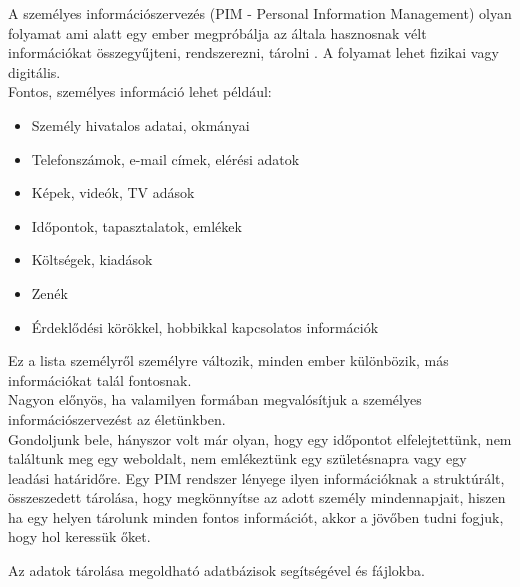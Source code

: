 
A személyes információszervezés (PIM - Personal Information Management) olyan folyamat ami alatt egy ember megpróbálja az általa hasznosnak vélt információkat összegyűjteni, rendszerezni, tárolni \cite{enwiki:1076787930}. A folyamat lehet fizikai vagy digitális.
\vspace{5pt}\\ Fontos, személyes információ lehet például:
\begin{itemize}
	\item Személy hivatalos adatai, okmányai
	\item Telefonszámok, e-mail címek, elérési adatok
	\item Képek, videók, TV adások
	\item Időpontok, tapasztalatok, emlékek
	\item Költségek, kiadások
	\item Zenék 
	\item Érdeklődési körökkel, hobbikkal kapcsolatos információk
\end{itemize}
Ez a lista személyről személyre változik, minden ember különbözik, más információkat talál fontosnak.
\vspace{5pt}\\ Nagyon előnyös, ha valamilyen formában megvalósítjuk a személyes információszervezést az életünkben. 
\\Gondoljunk bele, hányszor volt már olyan, hogy egy időpontot elfelejtettünk, nem találtunk meg egy weboldalt, nem emlékeztünk egy születésnapra vagy egy leadási határidőre. Egy PIM rendszer lényege ilyen információknak a struktúrált, összeszedett tárolása, hogy megkönnyítse az adott személy mindennapjait, hiszen ha egy helyen tárolunk minden fontos információt, akkor a jövőben tudni fogjuk, hogy hol keressük őket.

\newpage {}
Az adatok tárolása megoldható adatbázisok segítségével és fájlokba.

